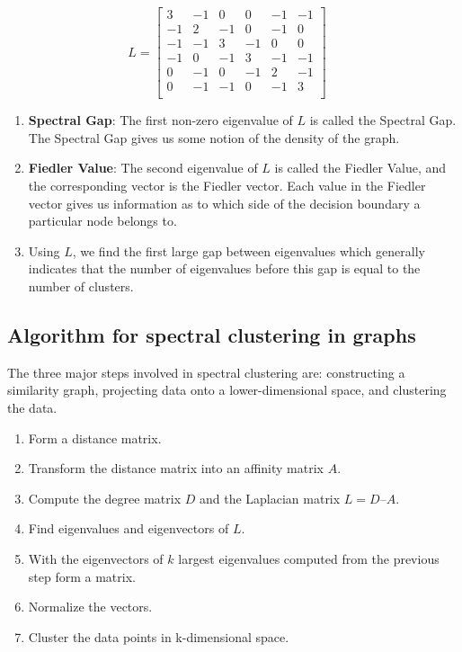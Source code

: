\documentclass{article}
\begin{document}
        $$ L = 
    	\begin{bmatrix} 
    	3 & -1 & 0 & 0 & -1 & -1 \\
    	-1 & 2 & -1 & 0 & -1 & 0 \\
    	-1 & -1 & 3 & -1 & 0 & 0 \\
     	-1 & 0 & -1 & 3 & -1 & -1 \\
      	0 & -1 & 0 & -1 & 2 & -1 \\
       	0 & -1 & -1 & 0 & -1 & 3 \\
    	\end{bmatrix}
    	\quad
        $$
        \begin{enumerate}
            \item \textbf{Spectral Gap}: The first non-zero eigenvalue of $L$ is called the Spectral Gap. The Spectral Gap gives us some notion of the density of the graph.
            \item \textbf{Fiedler Value}: The second eigenvalue of $L$ is called the Fiedler Value, and the corresponding vector is the Fiedler vector. Each value in the Fiedler vector gives us information as to which side of the decision boundary a particular node belongs to.
            \item Using $L$, we find the first large gap between eigenvalues which generally indicates that the number of eigenvalues before this gap is equal to the number of clusters.
        \end{enumerate}
    
    \subsection{Algorithm for spectral clustering in graphs}
    The three major steps involved in spectral clustering are: constructing a similarity graph, projecting data onto a lower-dimensional space, and clustering the data. 
        \begin{enumerate}[label=\textbf{Step \arabic*:}, wide=0pt, leftmargin=!, itemindent=2em]
            \item Form a distance matrix.
            \item Transform the distance matrix into an affinity matrix $A$.
            \item Compute the degree matrix $D$ and the Laplacian matrix $L = D – A$.
            \item Find eigenvalues and eigenvectors of $L$.
            \item With the eigenvectors of $k$ largest eigenvalues computed from the previous step form a matrix.
            \item Normalize the vectors.
            \item Cluster the data points in k-dimensional space.
        \end{enumerate}
    
\end{document}

